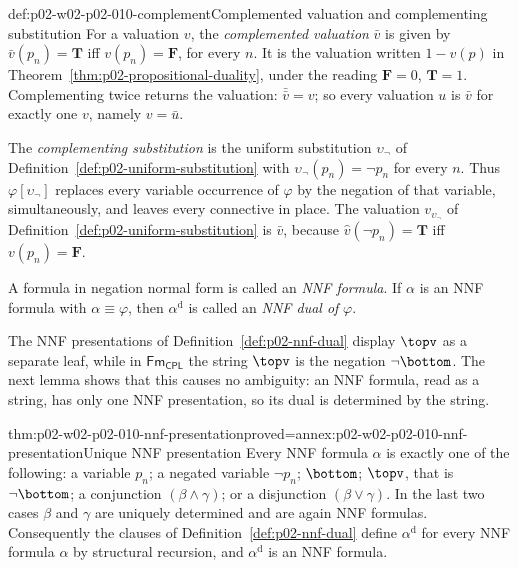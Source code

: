 \begin{hbconvention}{def:p02-w02-p02-010-complement}{Complemented valuation and complementing substitution}
For a valuation \(v\), the \emph{complemented valuation} \(\bar v\) is given by
\(\bar v(p_n)=\mathbf T\) iff \(v(p_n)=\mathbf F\), for every \(n\).  It is the
valuation written \(1-v(p)\) in
Theorem~\ref{thm:p02-propositional-duality}, under the reading
\(\mathbf F=0\), \(\mathbf T=1\).  Complementing twice returns the valuation:
\(\bar{\bar v}=v\); so every valuation \(u\) is \(\bar v\) for exactly one
\(v\), namely \(v=\bar u\).

The \emph{complementing substitution} is the uniform substitution
\(\upsilon_{\neg}\) of Definition~\ref{def:p02-uniform-substitution} with
\(\upsilon_{\neg}(p_n)=\neg p_n\) for every \(n\).  Thus
\(\varphi[\upsilon_{\neg}]\) replaces every variable occurrence of
\(\varphi\) by the negation of that variable, simultaneously, and leaves every
connective in place.  The valuation \(v_{\upsilon_{\neg}}\) of
Definition~\ref{def:p02-uniform-substitution} is \(\bar v\), because
\(\widehat v(\neg p_n)=\mathbf T\) iff \(v(p_n)=\mathbf F\).

A formula in negation normal form is called an \emph{NNF formula}.  If
\(\alpha\) is an NNF formula with \(\alpha\equiv\varphi\), then
\(\alpha^{\mathrm d}\) is called an \emph{NNF dual of} \(\varphi\).
\end{hbconvention}

The NNF presentations of Definition~\ref{def:p02-nnf-dual} display \(\topv\)
as a separate leaf, while in \(\mathsf{Fm}_{\mathsf{CPL}}\) the string
\(\topv\) is the negation \(\neg\bottom\).  The next lemma shows that this
causes no ambiguity: an NNF formula, read as a string, has only one NNF
presentation, so its dual is determined by the string.

\begin{hblemma}{thm:p02-w02-p02-010-nnf-presentation}{proved=annex:p02-w02-p02-010-nnf-presentation}{Unique NNF presentation}
Every NNF formula \(\alpha\) is exactly one of the following: a variable
\(p_n\); a negated variable \(\neg p_n\); \(\bottom\); \(\topv\), that is
\(\neg\bottom\); a conjunction \((\beta\land\gamma)\); or a disjunction
\((\beta\lor\gamma)\).  In the last two cases \(\beta\) and \(\gamma\) are
uniquely determined and are again NNF formulas.  Consequently the clauses of
Definition~\ref{def:p02-nnf-dual} define \(\alpha^{\mathrm d}\) for every NNF
formula \(\alpha\) by structural recursion, and \(\alpha^{\mathrm d}\) is an
NNF formula.
\end{hblemma}

